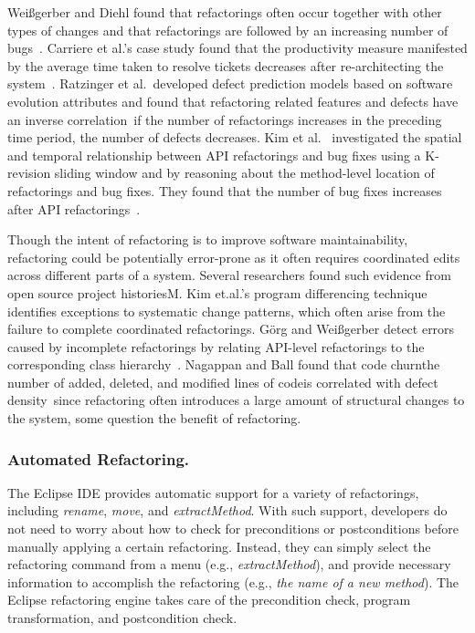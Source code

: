 Wei{\ss}gerber and Diehl found that refactorings often occur together with other types of changes and that refactorings are followed by an increasing number of bugs~\cite{Weissgerber2006:refactor}. Carriere et al.'s case study found that the productivity measure manifested by the average time taken to resolve tickets decreases after re-architecting the system~\cite{Carriere2010:architecture}. Ratzinger et al.~developed defect prediction models based on software evolution attributes and found that refactoring related features and defects have an inverse correlation~\cite{Ratzinger2008:refactor}\textemdash if the number of refactorings increases in the preceding time period, the number of defects decreases. Kim et al.~\cite{Kim2011:refactorbug} investigated the spatial and temporal relationship between API refactorings and bug fixes using a K-revision sliding window and by reasoning about the method-level location of refactorings and bug fixes. They found that the number of bug fixes increases after API refactorings~\cite{Kim2011:refactorbug}.  

Though the intent of refactoring is to improve software maintainability, refactoring could be potentially error-prone as it often requires coordinated edits across different parts of a system. Several researchers found such evidence from open source project histories\textemdash M. Kim et.al.'s program differencing technique~\cite{Kim2007,Kim:2009} identifies exceptions to systematic change patterns, which often arise from the failure to complete coordinated refactorings. G{\"o}rg and Wei{\ss}gerber detect errors caused by incomplete refactorings by relating API-level refactorings to the corresponding class hierarchy~\cite{Gorg2005a}. Nagappan and Ball found that code churn\textemdash the number of added, deleted, and modified lines of code\textemdash is correlated with defect density~\cite{Nagappan2005}\textemdash since refactoring often introduces a large amount of structural changes to the system, some question the benefit of refactoring. 

\subsubsection{Automated Refactoring.} 
\label{sec:automatedrefactoring} 

The Eclipse IDE provides automatic support for a variety of refactorings, including \emph{rename}, \emph{move}, and \emph{extractMethod}. With such support, developers do not need to worry about how to check for preconditions or postconditions before manually applying a certain refactoring. Instead, they can simply select the refactoring command from a menu (e.g., \emph{extractMethod}), and provide necessary information to accomplish the refactoring (e.g., \emph{the name of a new method}). The Eclipse refactoring engine takes care of the precondition check, program transformation, and postcondition check. 

